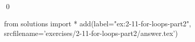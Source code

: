 
\begin{ex}
  \label{ex:2-11-for-loops-part2}
  
  \qed
\end{ex}
\begin{python0}
from solutions import *
add(label="ex:2-11-for-loops-part2",
    srcfilename='exercises/2-11-for-loops-part2/answer.tex')
\end{python0}
